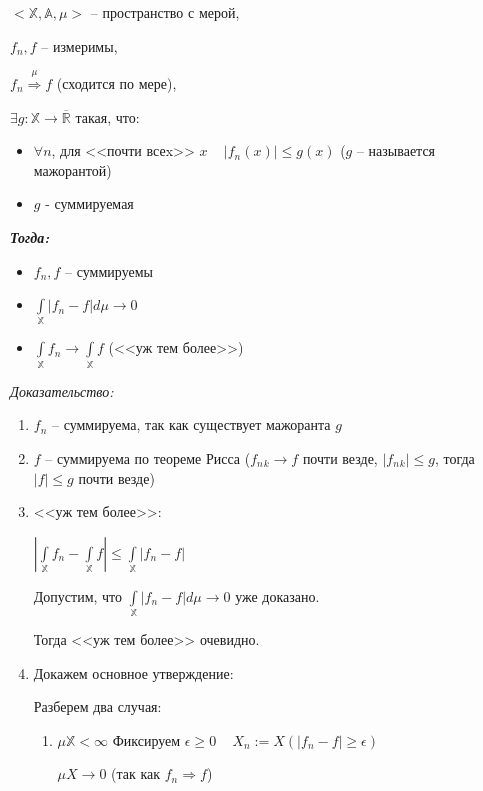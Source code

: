 \documentclass[paper=a4, fontsize=17pt]{article}
\begin{document}
\begin{flushleft}

$<\mathds{X}, \mathds{A}, \mu>$ -- пространство с мерой,

$f_n, f$ -- измеримы,

$f_n\stackrel{\mu}{\Rightarrow}f$ (сходится по мере),

$\exists g : \mathds{X} \rightarrow \overline{\mathds{R}}$ такая, что:
\begin{itemize}
\item
$\forall n$,  для <<почти всеx>> $x$ ~ $|f_n(x)| \leq g(x)$ ($g$ -- называется мажорантой)
\item
$g$ - суммируемая
\end{itemize}

\emph{\textbf{Тогда:}}
\begin{itemize}
    \item $f_n, f$ -- суммируемы
    \item $\int\limits_{\mathds{X}} |f_n - f| d\mu \rightarrow 0$
    \item $\int\limits_{\mathds{X}} f_n \rightarrow \int\limits_{\mathds{X}} f$ (<<уж тем более>>)
\end{itemize}

\emph{Доказательство:}

\begin{enumerate}
	\item $f_n$ -- суммируема, так как существует мажоранта $g$
	\item $f$ -- суммируема по теореме Рисса ($ f_n{_k} \rightarrow f $ почти везде, $ |f_n{_k}| \leq g$, тогда $|f| \leq g$ почти везде)
	\item <<уж тем более>>:

	$ |\int\limits_{\mathbb{X}} f_n - \int\limits_{\mathbb{X}} f| \leq \int\limits_{\mathbb{X}} |f_n - f| $

	Допустим, что $\int\limits_{\mathds{X}} |f_n - f| d\mu \rightarrow 0$ уже доказано.

	Тогда <<уж тем более>> очевидно.

	\item Докажем основное утверждение:

	Разберем два случая:
	\begin{enumerate}
		\item $ \mu \mathbb{X} < \infty $
		Фиксируем $ \epsilon \ge 0 $ ~ $ X_n := X(|f_n - f| \geq \epsilon) $

		$ \mu X \rightarrow 0 $ (так как $ f_n \Rightarrow f $)


\end{enumerate}
\end{enumerate}
\end{flushleft}
\end{document}
